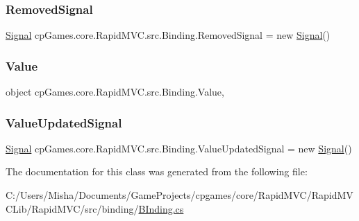 \subsubsection{\texorpdfstring{RemovedSignal}{RemovedSignal}}
{\footnotesize\ttfamily \mbox{\hyperlink{classcp_games_1_1core_1_1_rapid_m_v_c_1_1_signal}{Signal}} cp\+Games.\+core.\+Rapid\+M\+V\+C.\+src.\+Binding.\+Removed\+Signal = new \mbox{\hyperlink{classcp_games_1_1core_1_1_rapid_m_v_c_1_1_signal}{Signal}}()\hspace{0.3cm}{\ttfamily [get]}}

\mbox{\label{classcp_games_1_1core_1_1_rapid_m_v_c_1_1src_1_1_binding_a7c9fdf154e45fdeb327d8fa112cf56e4}} 
\subsubsection{\texorpdfstring{Value}{Value}}
{\footnotesize\ttfamily object cp\+Games.\+core.\+Rapid\+M\+V\+C.\+src.\+Binding.\+Value\hspace{0.3cm}{\ttfamily [get]}, {\ttfamily [set]}}

\mbox{\label{classcp_games_1_1core_1_1_rapid_m_v_c_1_1src_1_1_binding_a2ddb5b8252f62d19490f66734e654400}} 
\subsubsection{\texorpdfstring{ValueUpdatedSignal}{ValueUpdatedSignal}}
{\footnotesize\ttfamily \mbox{\hyperlink{classcp_games_1_1core_1_1_rapid_m_v_c_1_1_signal}{Signal}} cp\+Games.\+core.\+Rapid\+M\+V\+C.\+src.\+Binding.\+Value\+Updated\+Signal = new \mbox{\hyperlink{classcp_games_1_1core_1_1_rapid_m_v_c_1_1_signal}{Signal}}()\hspace{0.3cm}{\ttfamily [get]}}



The documentation for this class was generated from the following file\+:\begin{DoxyCompactItemize}
\item 
C\+:/\+Users/\+Misha/\+Documents/\+Game\+Projects/cpgames/core/\+Rapid\+M\+V\+C/\+Rapid\+M\+V\+C\+Lib/\+Rapid\+M\+V\+C/src/binding/\mbox{\hyperlink{_b_inding_8cs}{B\+Inding.\+cs}}\end{DoxyCompactItemize}
